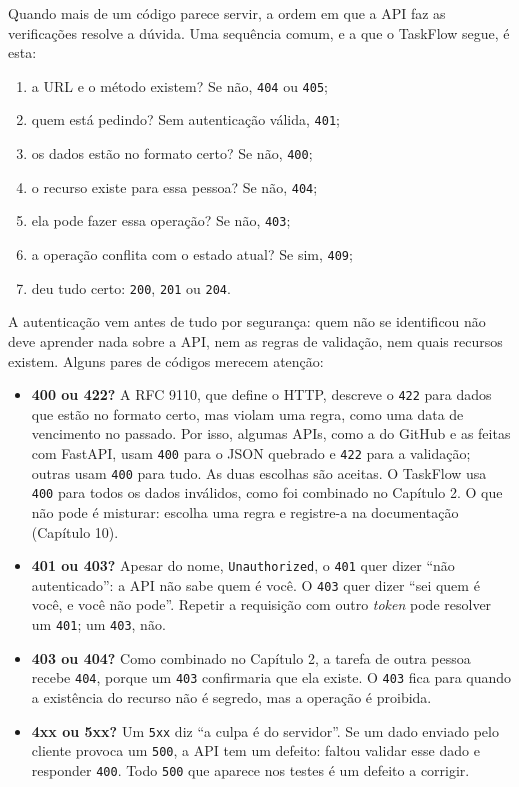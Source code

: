 Quando mais de um código parece servir, a ordem em que a API faz as verificações resolve a dúvida. Uma sequência comum, e a que o TaskFlow segue, é esta:

\begin{enumerate}
  \item a URL e o método existem? Se não, \texttt{404} ou \texttt{405};
  \item quem está pedindo? Sem autenticação válida, \texttt{401};
  \item os dados estão no formato certo? Se não, \texttt{400};
  \item o recurso existe para essa pessoa? Se não, \texttt{404};
  \item ela pode fazer essa operação? Se não, \texttt{403};
  \item a operação conflita com o estado atual? Se sim, \texttt{409};
  \item deu tudo certo: \texttt{200}, \texttt{201} ou \texttt{204}.
\end{enumerate}

A autenticação vem antes de tudo por segurança: quem não se identificou não deve aprender nada sobre a API, nem as regras de validação, nem quais recursos existem. Alguns pares de códigos merecem atenção:

\begin{itemize}
  \item \textbf{400 ou 422?} A RFC 9110, que define o HTTP, descreve o \texttt{422} para dados que estão no formato certo, mas violam uma regra, como uma data de vencimento no passado. Por isso, algumas APIs, como a do GitHub e as feitas com FastAPI, usam \texttt{400} para o JSON quebrado e \texttt{422} para a validação; outras usam \texttt{400} para tudo. As duas escolhas são aceitas. O TaskFlow usa \texttt{400} para todos os dados inválidos, como foi combinado no Capítulo 2. O que não pode é misturar: escolha uma regra e registre-a na documentação (Capítulo 10).
  \item \textbf{401 ou 403?} Apesar do nome, \texttt{Unauthorized}, o \texttt{401} quer dizer ``não autenticado'': a API não sabe quem é você. O \texttt{403} quer dizer ``sei quem é você, e você não pode''. Repetir a requisição com outro \textit{token} pode resolver um \texttt{401}; um \texttt{403}, não.
  \item \textbf{403 ou 404?} Como combinado no Capítulo 2, a tarefa de outra pessoa recebe \texttt{404}, porque um \texttt{403} confirmaria que ela existe. O \texttt{403} fica para quando a existência do recurso não é segredo, mas a operação é proibida.
  \item \textbf{4xx ou 5xx?} Um \texttt{5xx} diz ``a culpa é do servidor''. Se um dado enviado pelo cliente provoca um \texttt{500}, a API tem um defeito: faltou validar esse dado e responder \texttt{400}. Todo \texttt{500} que aparece nos testes é um defeito a corrigir.
\end{itemize}

